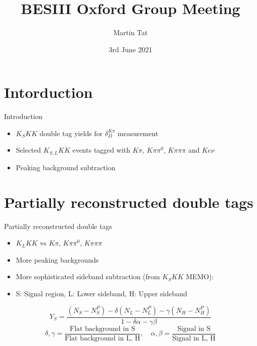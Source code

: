 \documentclass{beamer}
\title[BESIII Oxford]{BESIII Oxford Group Meeting}
\author{Martin Tat}
\institute{Oxford LHCb}
\date{3rd June 2021}
\begin{document}
\begin{frame}
  \titlepage
\end{frame}


\section{Intorduction}
\begin{frame}{Introduction}
  \begin{itemize}
    \setlength\itemsep{2em}
    \item{$K_SKK$ double tag yields for $\delta_D^{K\pi}$ measurement}
    \item{Selected $K_{S, L}KK$ events tagged with $K\pi$, $K\pi\pi^0$, $K\pi\pi\pi$ and $Ke\nu$}
    \item{Peaking background subtraction}
  \end{itemize}
\end{frame}

\section{Partially reconstructed double tags}
\begin{frame}{Partially reconstructed double tags}
  \begin{itemize}
    \setlength\itemsep{1em}
    \item{$K_LKK$ vs $K\pi$, $K\pi\pi^0$, $K\pi\pi\pi$}
    \item{More peaking backgrounds}
    \item{More sophisticated sideband subtraction (from $K_SKK$ MEMO):}
    \item{S: Signal region, L: Lower sideband, H: Upper sideband}
  \end{itemize}
  \begin{equation*}
    Y_S = \frac{(N_S - N_S^P) - \delta(N_L - N_L^P) - \gamma(N_H - N_H^P)}{1 - \delta\alpha - \gamma\beta}
  \end{equation*}
  \begin{equation*}
    \delta, \gamma = \frac{\text{Flat background in S}}{\text{Flat background in L, H}}, \quad \alpha, \beta = \frac{\text{Signal in S}}{\text{Signal in L, H}}
  \end{equation*}
\end{frame}
\end{document}
